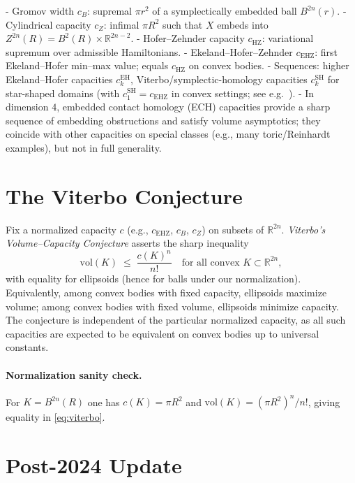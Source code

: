 - Gromov width $c_B$: supremal $\pi r^2$ of a symplectically embedded ball $B^{2n}(r)$.
- Cylindrical capacity $c_Z$: infimal $\pi R^2$ such that $X$ embeds into $Z^{2n}(R)=B^2(R)\times\mathbb{R}^{2n-2}$.
- Hofer--Zehnder capacity $c_{\mathrm{HZ}}$: variational supremum over admissible Hamiltonians.
- Ekeland--Hofer--Zehnder $c_{\mathrm{EHZ}}$: first Ekeland--Hofer min--max value; equals $c_{\mathrm{HZ}}$ on convex bodies\cite{CHLS2007}.
- Sequences: higher Ekeland--Hofer capacities $c_k^{\mathrm{EH}}$, Viterbo/symplectic-homology capacities
  $c_k^{\mathrm{SH}}$ for star-shaped domains (with $c_1^{\mathrm{SH}}=c_{\mathrm{EHZ}}$ in convex settings; see e.g.\ \cite{Irie2022}).
- In dimension $4$, embedded contact homology (ECH) capacities provide a sharp sequence of embedding
  obstructions and satisfy volume asymptotics\cite{CristofaroGardiner2015,Hutchings2014}; they coincide with
  other capacities on special classes (e.g., many toric/Reinhardt examples), but not in full generality.

\section{The Viterbo Conjecture}

Fix a normalized capacity $c$ (e.g., $c_{\mathrm{EHZ}}$, $c_B$, $c_Z$) on subsets of $\mathbb{R}^{2n}$.
\emph{Viterbo's Volume--Capacity Conjecture} asserts the sharp inequality
\begin{equation}\label{eq:viterbo}
  \mathrm{vol}(K) \;\le\; \frac{c(K)^n}{n!}\quad\text{for all convex }K\subset\mathbb{R}^{2n},
\end{equation}
with equality for ellipsoids (hence for balls under our normalization). Equivalently, among convex
bodies with fixed capacity, ellipsoids maximize volume; among convex bodies with fixed volume,
ellipsoids minimize capacity. The conjecture is independent of the particular normalized capacity,
as all such capacities are expected to be equivalent on convex bodies up to universal constants.

\paragraph{Normalization sanity check.}
For $K=B^{2n}(R)$ one has $c(K)=\pi R^2$ and $\mathrm{vol}(K)=(\pi R^2)^n/n!$, giving equality in
\eqref{eq:viterbo}.

\section{Post-2024 Update}

